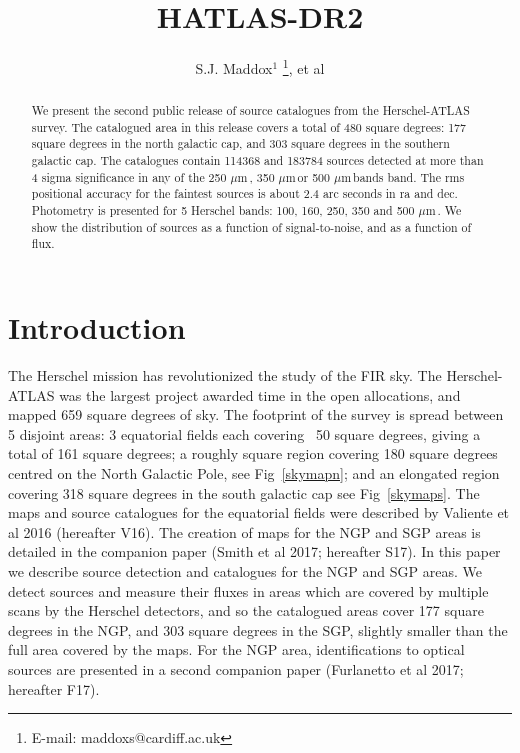 \documentclass[useAMS,usenatbib]{mn2e}
\title[The Herschel--ATLAS 2nd data release]{HATLAS-DR2}
\author[S.J. Maddox]{\parbox{\textwidth}{S.J. Maddox$^{1}$
\thanks{E-mail: maddoxs@cardiff.ac.uk}, et al }}
\def\mic{ $\mu $m\,}
\begin{document}
\date{}

\pagerange{\pageref{firstpage}--\pageref{lastpage}}

\maketitle

\label{firstpage}

\begin{abstract}
  We present the second public release of source catalogues from the
  Herschel-ATLAS survey. The catalogued area in this release covers a
  total of 480 square degrees: 177 square degrees in the north
  galactic cap, and 303 square degrees in the southern galactic
  cap. The catalogues contain 114368 and 183784 sources detected at
  more than 4 sigma significance in any of the 250\mic, 350\mic or
  500\mic bands band. The rms positional accuracy for the faintest
  sources is about 2.4 arc seconds in ra and dec. Photometry is
  presented for 5 Herschel bands: 100, 160, 250, 350 and 500\mic. We
  show the distribution of sources as a function of signal-to-noise,
  and as a function of flux.
  


\end{abstract}

\begin{keywords}

\end{keywords}

\section{Introduction}

The Herschel mission has revolutionized the study of the FIR sky. The
Herschel-ATLAS was the largest project awarded time in the open
allocations, and mapped 659 square degrees of sky.  The footprint of
the survey is spread between 5 disjoint areas: 3 equatorial fields
each covering ~50 square degrees, giving a total of 161 square
degrees; a roughly square region covering 180 square degrees centred
on the North Galactic Pole, see Fig~\ref{skymapn}; and an elongated
region covering 318 square degrees in the south galactic cap see
Fig~\ref{skymaps}.  The maps and source catalogues for the equatorial
fields were described by Valiente et al 2016 (hereafter V16).  The
creation of maps for the NGP and SGP areas is detailed in the
companion paper (Smith et al 2017; hereafter S17). In this paper we
describe source detection and catalogues for the NGP and SGP areas. We
detect sources and measure their fluxes in areas which are covered by
multiple scans by the Herschel detectors, and so the catalogued areas
cover 177 square degrees in the NGP, and 303 square degrees in the
SGP, slightly smaller than the full area covered by the maps. For the
NGP area, identifications to optical sources are presented in a second
companion paper (Furlanetto et al 2017; hereafter F17).
\end{document}
